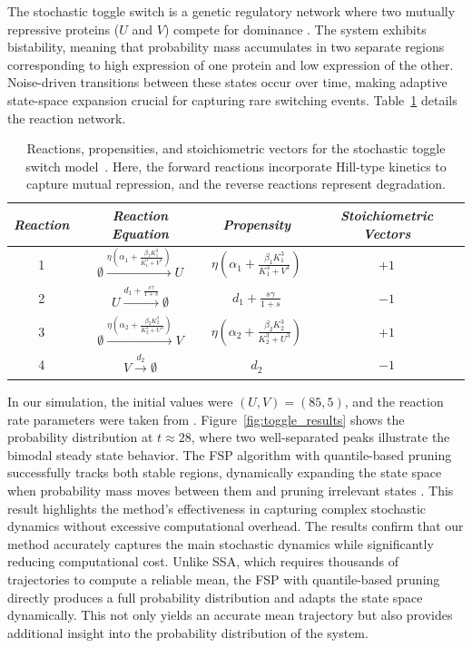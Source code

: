 \documentclass[review,onefignum,onetabnum]{siamart171218}
\begin{document}
The stochastic toggle switch is a genetic regulatory network where two mutually repressive proteins (\(U\) and \(V\)) compete for dominance \cite{tian_stochastic_2006}. The system exhibits bistability, meaning that probability mass accumulates in two separate regions corresponding to high expression of one protein and low expression of the other. Noise-driven transitions between these states  occur over time, making adaptive state-space expansion crucial for capturing rare switching events. Table~\ref{table:toggle} details the reaction network.

\begin{table}[!htbp]
\centering
\begin{tabular}{|c|c|c|c|}
\hline
\textit{Reaction} & \textit{Reaction Equation} & \textit{Propensity} & \textit{Stoichiometric Vectors} \\
\hline
1 & \(\emptyset \xrightarrow{\eta\left(\alpha_1 + \frac{\beta_1K_1^3}{K_1^3+V^3}\right)} U\) & \(\eta\left(\alpha_1 + \frac{\beta_1K_1^3}{K_1^3+V^3}\right)\) & \(+1\) \\
2 & \(U \xrightarrow{d_1+\frac{s\gamma}{1+s}} \emptyset\) & \(d_1+\frac{s\gamma}{1+s}\) & \(-1\) \\
3 & \(\emptyset \xrightarrow{\eta\left(\alpha_2 + \frac{\beta_2K_2^3}{K_2^3+U^3}\right)} V\) & \(\eta\left(\alpha_2 + \frac{\beta_2K_2^3}{K_2^3+U^3}\right)\) & \(+1\) \\
4 & \(V \xrightarrow{d_2} \emptyset\) & \(d_2\) & \(-1\) \\
\hline
\end{tabular}
\caption{Reactions, propensities, and stoichiometric vectors for the stochastic toggle switch model~\cite{tian_stochastic_2006, doi:10.1137/060678154}. Here, the forward reactions incorporate Hill-type kinetics to capture mutual repression, and the reverse reactions represent degradation.}
\label{table:toggle}
\end{table}

In our simulation, the initial values were \((U,V) = (85,5)\), and the reaction rate parameters were taken from \cite{doi:10.1137/060678154}. Figure~\ref{fig:toggle_results} shows the probability distribution at \(t \approx 28\), where two well-separated peaks illustrate the bimodal steady state behavior. The FSP algorithm with quantile-based pruning successfully tracks both stable regions, dynamically expanding the state space when probability mass moves between them and pruning irrelevant states . This result highlights the method's effectiveness in capturing complex stochastic dynamics without excessive computational overhead. The results confirm that our method accurately captures the main stochastic dynamics while significantly reducing computational cost. Unlike SSA, which requires thousands of trajectories to compute a reliable mean, the FSP with quantile-based pruning directly produces a full probability distribution and adapts the state space dynamically. This not only yields an accurate mean trajectory but also provides additional insight into the probability distribution of the system.
\end{document}
